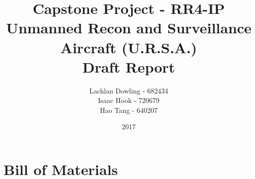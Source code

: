 \documentclass[12pt]{report}
\title{Capstone Project - RR4-IP \\Unmanned Recon and Surveillance Aircraft (U.R.S.A.) \\ \Huge Draft Report}
\author{\large Lachlan Dowling - 682434 \\ Isaac Hook - 720679 \\ Hao Tang - 640207 }
\date{2017}
\begin{document}
\thispagestyle{empty}
    \maketitle
    \thispagestyle{empty}
    
    \newpage

    \clearpage
    \setcounter{page}{1}



\tableofcontents








{}


\appendix
\appendixpage
\chapter{Bill of Materials}

% 
% 
% 
% 
% 
% 
\end{document}
